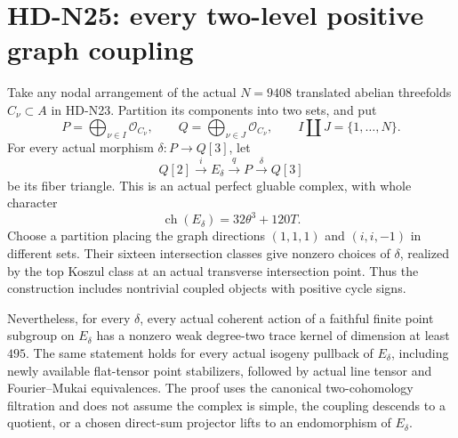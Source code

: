 \section{HD-N25: every two-level positive graph coupling}
\label{sec:two-level-positive-graph-cones}

Take any nodal arrangement of the actual $N=9408$ translated
abelian threefolds $C_\nu\subset A$ in HD-N23. Partition its
components into two sets, and put
\[
 P=\bigoplus_{\nu\in I}\mathcal O_{C_\nu},\qquad
 Q=\bigoplus_{\nu\in J}\mathcal O_{C_\nu},\qquad
 I\amalg J=\{1,\ldots,N\}.
                                                               \tag{N25.1}
\]
For every actual morphism
$\delta:P\to Q[3]$, let
\[
             Q[2]\xrightarrow{i}E_\delta\xrightarrow{q}P
                     \xrightarrow{\delta}Q[3]              \tag{N25.2}
\]
be its fiber triangle. This is an actual perfect gluable
complex, with whole character
\[
             \operatorname{ch}(E_\delta)=32\theta^3+120T.
                                                               \tag{N25.3}
\]
Choose a partition placing the graph directions $(1,1,1)$
and $(i,i,-1)$ in different sets. Their sixteen intersection
classes give nonzero choices of $\delta$, realized by the top
Koszul class at an actual transverse intersection point.
Thus the construction includes nontrivial coupled objects
with positive cycle signs.

Nevertheless, for every $\delta$, every actual coherent action
of a faithful finite point subgroup on $E_\delta$ has a
nonzero weak degree-two trace kernel of dimension at least
$495$. The same statement holds for every actual isogeny
pullback of $E_\delta$, including newly available flat-tensor
point stabilizers, followed by actual line tensor and
Fourier--Mukai equivalences. The proof uses the canonical two-cohomology
filtration and does not assume the complex is simple, the
coupling descends to a quotient, or a chosen direct-sum
projector lifts to an endomorphism of $E_\delta$.

